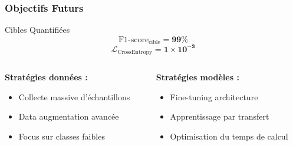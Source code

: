 \documentclass[
	11pt,
	aspectratio=169,
]{beamer}
\begin{document}
\begin{frame}
	\frametitle{Objectifs Futurs}
	
	\begin{block}{Cibles Quantifiées}
		\begin{equation*}
			\text{F1-score}_{\text{cible}} = \mathbf{99\%}
		\end{equation*}
		\begin{equation*}
			\mathcal{L}_{\text{CrossEntropy}} = \mathbf{1 \times 10^{-3}}
		\end{equation*}
	\end{block}
	
	\bigskip
	
	\begin{columns}[t]
		\begin{column}{0.5\textwidth}
			\textbf{Stratégies données :}
			\begin{itemize}
				\item Collecte massive d'échantillons
				\item Data augmentation avancée
				\item Focus sur classes faibles
			\end{itemize}
		\end{column}
		
		\begin{column}{0.5\textwidth}
			\textbf{Stratégies modèles :}
			\begin{itemize}
				\item Fine-tuning architecture
				\item Apprentissage par transfert
				\item Optimisation du temps de calcul
			\end{itemize}
		\end{column}
	\end{columns}
\end{frame}

\end{document}
